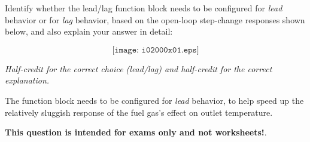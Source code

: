 

Identify whether the lead/lag function block needs to be configured for {\it lead} behavior or for {\it lag} behavior, based on the open-loop step-change responses shown below, and also explain your answer in detail:

$$\texttt{[image: i02000x01.eps]}$$

\vskip 50pt







{\it Half-credit for the correct choice (lead/lag) and half-credit for the correct explanation.}

\vskip 10pt

The function block needs to be configured for {\it lead} behavior, to help speed up the relatively sluggish response of the fuel gas's effect on outlet temperature.







{\bf This question is intended for exams only and not worksheets!}.



